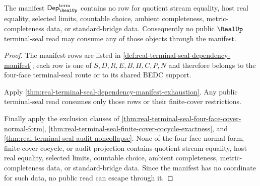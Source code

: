 \begin{theorem}
\label{thm:real-terminal-seal-dependency-manifest-non-escape}
The manifest $\mathsf{Dep}_{\RealUp}^{\mathrm{term}}$ contains no row for
quotient stream equality, host real equality, selected limits, countable
choice, ambient completeness, metric-completeness data, or standard-bridge
data. Consequently no public $\RealUp$ terminal-seal read may consume any of
those objects through the manifest.
\end{theorem}
\begin{proof}
The manifest rows are listed in
\autoref{def:real-terminal-seal-dependency-manifest}; each row is one of
$S,D,R,E,B,H,C,P,N$ and therefore belongs to the four-face terminal-seal route
or to its shared BEDC support.

Apply \autoref{thm:real-terminal-seal-dependency-manifest-exhaustion}. Any
public terminal-seal read consumes only those rows or their finite-cover
restrictions.

Finally apply the exclusion clauses of
\autoref{thm:real-terminal-seal-four-face-cover-normal-form},
\autoref{thm:real-terminal-seal-finite-cover-cocycle-exactness}, and
\autoref{thm:real-terminal-seal-audit-noncollapse}. None of the four-face
normal form, finite-cover cocycle, or audit projection contains quotient stream
equality, host real equality, selected limits, countable choice, ambient
completeness, metric-completeness data, or standard-bridge data. Since the
manifest has no coordinate for such data, no public read can escape through it.
\end{proof}

